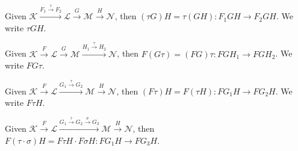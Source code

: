 Given $\mathcal{K} \xrightarrow{F_1 \xrightarrow{\tau} F_2} \mathcal{L} \xrightarrow{G} \mathcal{M} \xrightarrow{H} \mathcal{N}$, then $(\tau G) H = \tau(G H): F_1 G H \rightarrow F_2 G H$. We write $\tau G H$.

Given $\mathcal{K} \xrightarrow{F} \mathcal{L} \xrightarrow{G} \mathcal{M} \xrightarrow{H_1 \xrightarrow{\tau} H_2} \mathcal{N}$, then $F(G \tau) = (FG) \tau: F G H_1 \rightarrow F G H_2$. We write $F G \tau$.

Given $\mathcal{K} \xrightarrow{F} \mathcal{L} \xrightarrow{G_1 \xrightarrow{\tau} G_2} \mathcal{M} \xrightarrow{H} \mathcal{N}$, then $(F \tau) H = F(\tau H): F G_1 H \rightarrow F G_2 H$. We write $F \tau H$.

Given $\mathcal{K} \xrightarrow{F} \mathcal{L} \xrightarrow{G_1 \xrightarrow{\tau} G_2 \xrightarrow{\sigma} G_3} \mathcal{M} \xrightarrow{H} \mathcal{N}$, then $F(\tau \cdot \sigma) H = F \tau H \cdot F \sigma H: F G_1 H \rightarrow F G_3 H$.
